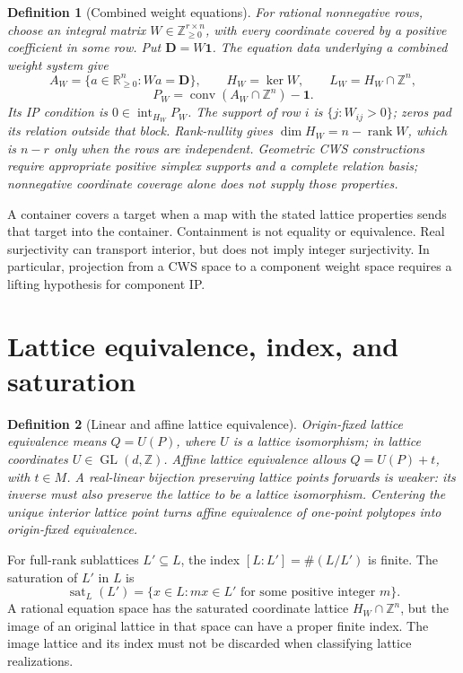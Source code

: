 \documentclass[11pt,a4paper,oneside]{report}
\newtheorem{definition}{Definition}[chapter]
\begin{document}
\begin{definition}[Combined weight equations]
For rational nonnegative rows, choose an integral matrix
\(W\in\mathbb{Z}_{\geq0}^{r\times n}\), with every coordinate covered by
a positive coefficient in some row. Put \(\mathbf{D}=W\mathbf{1}\).
The equation data underlying a combined weight system give
\[
  A_W=\{a\in\mathbb{R}_{\geq0}^{n}:Wa=\mathbf{D}\},\qquad
  H_W=\ker W,\qquad L_W=H_W\cap\mathbb{Z}^{n},
\]
\[
  P_W=\operatorname{conv}(A_W\cap\mathbb{Z}^{n})-\mathbf{1}.
\]
Its IP condition is \(0\in\operatorname{int}_{H_W}P_W\).
The support of row \(i\) is \(\{j:W_{ij}>0\}\); zeros pad its relation
outside that block.
Rank-nullity gives \(\dim H_W=n-\operatorname{rank}W\), which is \(n-r\)
only when the rows are independent. Geometric CWS constructions require
appropriate positive simplex supports and a complete relation basis;
nonnegative coordinate coverage alone does not supply those properties.
\end{definition}

A container covers a target when a map with the stated lattice properties
sends that target into the container. Containment is not equality or
equivalence. Real surjectivity can transport interior, but does not imply
integer surjectivity. In particular, projection from a CWS space to a
component weight space requires a lifting hypothesis for component IP.

\section{Lattice equivalence, index, and saturation}

\begin{definition}[Linear and affine lattice equivalence]
Origin-fixed lattice equivalence means \(Q=U(P)\), where \(U\) is a
lattice isomorphism; in lattice coordinates \(U\in\operatorname{GL}(d,\mathbb{Z})\).
Affine lattice equivalence allows \(Q=U(P)+t\), with \(t\in M\).
A real-linear bijection preserving lattice points forwards is weaker:
its inverse must also preserve the lattice to be a lattice isomorphism.
Centering the unique interior lattice point turns affine equivalence of
one-point polytopes into origin-fixed equivalence.
\end{definition}

For full-rank sublattices \(L'\subseteq L\), the index
\([L:L']=\#(L/L')\) is finite. The saturation of \(L'\) in \(L\) is
\[
  \operatorname{sat}_{L}(L')
   =\{x\in L:mx\in L'\text{ for some positive integer }m\}.
\]
A rational equation space has the saturated coordinate lattice
\(H_W\cap\mathbb{Z}^{n}\), but the image of an original lattice in that
space can have a proper finite index. The image lattice and its index
must not be discarded when classifying lattice realizations.
\end{document}
